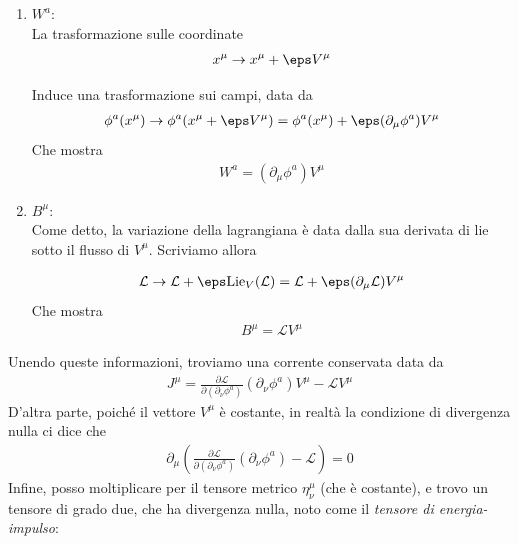 \documentclass{report}
\begin{document}
{    \begin{enumerate}
        \item \(W^a\): \\
        La trasformazione sulle coordinate 
        \begin{align}
            x^\mu \rightarrow x^\mu + \eps V^\mu
        \end{align}

        Induce una trasformazione sui campi, data da 
        \begin{align}
            \phi^a(x^\mu) \rightarrow \phi^a(x^\mu + \eps V^\mu) = \phi^a (x^\mu) + \eps (\partial_\mu \phi^a) V^\mu
        \end{align}
        Che mostra 
        \begin{align}
            W^a = (\partial_\mu \phi^a)V^\mu
        \end{align}
        \item \(B^\mu\): \\
        Come detto, la variazione della lagrangiana è data dalla sua derivata di lie sotto il flusso di \(V^\mu\). Scriviamo allora 

        \begin{align}
            \mathcal{L} \rightarrow \mathcal{L} + \eps \text{Lie}_V (\mathcal{L}) = \mathcal{L} + \eps (\partial_\mu \mathcal{L})V^{\mu}
        \end{align}
        Che mostra 
        \begin{align}
            B^{\mu} = \mathcal{L}V^{\mu}
        \end{align}
    \end{enumerate}

    Unendo queste informazioni, troviamo una corrente conservata data da 
    \begin{align}
        J^\mu = \frac{\partial \mathcal{L}}{\partial (\partial_\nu \phi^a)}(\partial_\nu \phi^a)V^\mu - \mathcal{L}V^{\mu}
    \end{align}
    D'altra parte, poiché il vettore \(V^\mu\) è costante, in realtà la condizione di divergenza nulla ci dice che 
    \begin{align}
        \partial_\mu \left(\frac{\partial \mathcal{L}}{\partial (\partial_\nu \phi^a)}(\partial_\nu \phi^a) - \mathcal{L}\right) =0
    \end{align}
    Infine, posso moltiplicare per il tensore metrico \(\eta^\mu_\nu\) (che è costante), e trovo un tensore di grado due, che ha divergenza nulla, noto come il \emph{tensore di energia-impulso}: 

}
\end{document}
